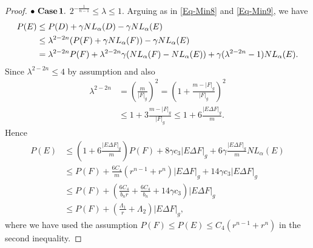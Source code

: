 \documentclass[11pt,reqno]{amsart}
\theoremstyle{definition}
\theoremstyle{remark}
\numberwithin{equation}{section}
\renewcommand{\(}{\left(}
\renewcommand{\)}{\right)}
\renewcommand{\-}{\overline}
\begin{document}
\begin{proof}
$\bullet\,\,\bf{Case\,1.}$ $2^{-\frac{1}{n-1}}\leq\lambda\leq 1$. Arguing as in \eqref{Eq-Min8} and \eqref{Eq-Min9}, we have
\begin{align}
	P(E)&\leq P(D)+\gamma NL_{\alpha}(D)-\gamma NL_{\alpha}(E)\notag\\
	&\leq {\lambda}^{2-2n}(P(F)+\gamma NL_{\alpha}(F))-\gamma NL_{\alpha}(E)\notag\\
	&={\lambda}^{2-2n} P(F)+{\lambda}^{2-2n}\gamma(NL_{\alpha}(F)-NL_{\alpha}(E))+\gamma({\lambda^{2-2n}}-1)NL_{\alpha}(E).\label{Qp2}
\end{align}
Since $\lambda^{2-2n}\leq 4$ by assumption and also
\begin{align*}
	{\lambda}^{2-2n}&=\left(\frac{m}{|F|_g}\right)^2=\left(1+\frac{m-|F|_g}{|F|_g}\right)^2\\
	&\leq 1+3\frac{m-|F|_g}{|F|_g}\leq 1+6 \frac{|E\Delta F|_g}{m}.
\end{align*}
Hence 
\begin{align*}
	P(E)&\leq\left(1+6 \frac{|E\Delta F|_g}{m}\right)P(F)+8\gamma c_3|E\Delta F|_g+6\gamma\frac{|E\Delta F|_g}{m}NL_{\alpha}(E)\\
	&\leq P(F)+\frac{6C_4}{m}(r^{n-1}+r^n)|E\Delta F|_g+14\gamma c_3|E\Delta F|_g\\
	&\leq P(F)+\left(\frac{6C_4}{b_n r}+\frac{6C_4}{b_n}+14\gamma c_3\right)|E\Delta F|_g\\
	&\leq P(F)+\left(\frac{\Lambda_1}{r}+\Lambda_2\right)|E\Delta F|_g,
\end{align*}
where we have used the assumption $P(F)\leq P(E)\leq C_4(r^{n-1}+r^n)$ in the second inequality.


\end{proof}
\end{document}
